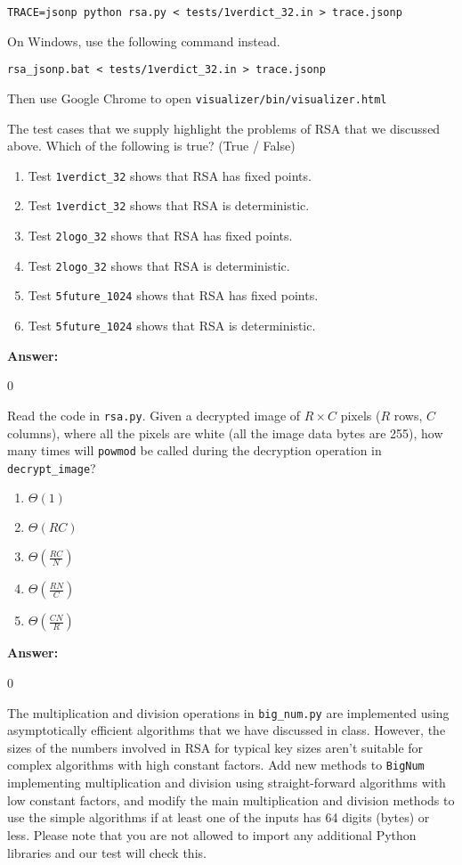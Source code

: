 \documentclass[12pt,twoside]{article}
\newcommand{\answer}{
 \par\medskip
 \textbf{Answer:}
}
\newcommand{\answerIIIe}{ \answer
0
}
\newcommand{\answerIIIf}{ \answer
0
}
\begin{document}
\begin{problems}
\texttt{TRACE=jsonp python rsa.py < tests/1verdict\_32.in > trace.jsonp}

On Windows, use the following command instead.

\texttt{rsa\_jsonp.bat < tests/1verdict\_32.in > trace.jsonp}

Then use Google Chrome to open
\texttt{visualizer/bin/visualizer.html}

\begin{problemparts}
\problempart {} The test cases that we supply highlight the problems of
RSA that we discussed above. Which of the following is true? (True / False)
\begin{enumerate}
  \item Test \texttt{1verdict\_32} shows that RSA has fixed points.
  \item Test \texttt{1verdict\_32} shows that RSA is deterministic.
  \item Test \texttt{2logo\_32} shows that RSA has fixed points.
  \item Test \texttt{2logo\_32} shows that RSA is deterministic.
  \item Test \texttt{5future\_1024} shows that RSA has fixed points.
  \item Test \texttt{5future\_1024} shows that RSA is deterministic.
\end{enumerate}
\answerIIIe

\problempart {} Read the code in \texttt{rsa.py}. Given a decrypted
image of $R \times C$ pixels ($R$ rows, $C$ columns), where all the pixels
are white (all the image data bytes are 255), how many times will
\texttt{powmod} be called during the decryption operation in
\texttt{decrypt\_image}?
\begin{enumerate}
  \item $\Theta(1)$
  \item $\Theta(R C)$
  \item $\Theta(\frac{RC}{N})$
  \item $\Theta(\frac{RN}{C})$
  \item $\Theta(\frac{CN}{R})$
\end{enumerate}
\answerIIIf

\problempart {} The multiplication and division operations in
\texttt{big\_num.py} are implemented using asymptotically efficient algorithms
that we have discussed in class. However, the sizes of the numbers involved in
RSA for typical key sizes aren't suitable for complex algorithms with high
constant factors. Add new methods to \texttt{BigNum} implementing multiplication
and division using straight-forward algorithms with low constant factors, and
modify the main multiplication and division methods to use the simple algorithms
if at least one of the inputs has 64 digits (bytes) or less. Please note that
you are not allowed to import any additional Python libraries and our test will
check this.
\end{problemparts}


\end{problems}
\end{document}
